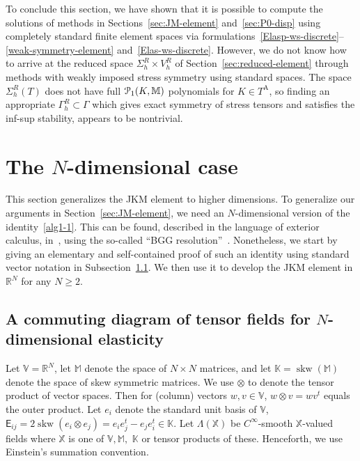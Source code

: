 \documentclass[12pt]{amsart}
\numberwithin{equation}{section}
\theoremstyle{definition}
\theoremstyle{remark}
\newcommand{\R}{\mathbb{R}}
\newcommand{\V}{\mathbb{V}}
\newcommand{\M}{\mathbb{M}}
\newcommand{\X}{\mathbb{X}}
\newcommand{\K}{\mathbb{K}}
\renewcommand{\(}{\bigl(}
\renewcommand{\)}{\bigr)}
\newcommand{\EK}{\mathsf{E}}
\newcommand{\pol}{\EuScript{P}}
\newcommand{\Ta}{T^{\text{A}}}
\newcommand\skw{\operatorname{skw}}
\begin{document}
To conclude this section, we have shown that it is possible to compute
the solutions of methods in Sections~\ref{sec:JM-element}
and~\ref{sec:P0-disp} using completely standard finite element spaces
via  formulations~\eqref{Elasp-ws-discrete}--\eqref{weak-symmetry-element}
and~\eqref{Elas-ws-discrete}.
However, we do not know how to arrive at
the reduced space $\Sigma_h^R \times V_h^R$ of
Section~\ref{sec:reduced-element} through methods with weakly imposed stress symmetry using standard spaces.
The space $\Sigma_h^R(T)$ does not have full
$\pol_1(K,\mathbb{M})$ polynomials for $K \in \Ta$, so finding an
appropriate $\Gamma_h^R \subset \Gamma$ which gives exact symmetry of
stress tensors and satisfies the inf-sup stability, appears to be nontrivial.




\section{The $N$-dimensional case}
\label{sec:ndim-case}

This section generalizes the JKM element to higher
dimensions.  To generalize our arguments in
Section~\ref{sec:JM-element}, we need an $N$-dimensional version of
the identity~\eqref{alg1-1}. This can be found, described in the
language of exterior calculus, in~\cite{arnold2006finite,
  arnold2021complexes, Falk08}, using the so-called ``BGG resolution''~\cite{arnold2007mixed,calabi1961compact, eastwood2000complex}. Nonetheless, we start by giving an
elementary and self-contained proof of such an identity using standard
vector notation in Subsection~\ref{ssec:comm-diagr-tens}.  We then use
it to develop the JKM element in $\mathbb{R}^N$ for any
$N\ge 2$.




\subsection{A commuting diagram of tensor fields for
  $N$-dimensional elasticity}  \label{ssec:comm-diagr-tens}

Let $\V = \R^N$, let $\M$ denote the space of $N \times N$ matrices, and let $\K = \skw(\M)$ denote the space of skew symmetric matrices. 
We use  $\otimes$ to denote the tensor product of vector spaces. Then
for (column) vectors  $w, v \in \V$, 
$w \otimes v= w v^t$ equals the outer product. Let 
$e_i$ denote the standard unit basis of $\V$,
$\EK_{ij}=2 \skw(e_i \otimes e_j)= e_i e_j^t- e_j e_i^t \in \K$.
Let
$\Lambda(\X)$ be $C^\infty$-smooth $\X$-valued fields where $\X$ is
one of $\V, \M,$ $\K$ or tensor products of these. 
Henceforth, we use Einstein's summation convention.
\end{document}
